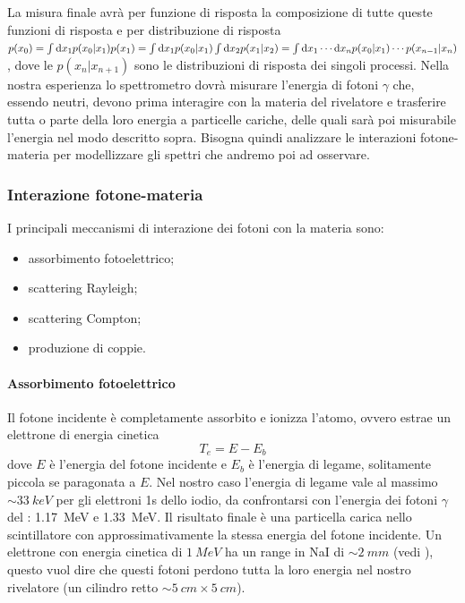 La misura finale avrà per funzione di risposta la composizione di tutte queste funzioni di risposta e per distribuzione di risposta  $p(x_0)=\int\mathrm{d} x_1 p(x_0|x_1) p(x_1)
=\int \mathrm{d} x_1 p(x_0|x_1) \int \mathrm{d} x_2 p(x_1|x_2)
=\int \mathrm{d} x_1 \dotsm \mathrm{d} x_n p(x_0|x_1)\dotsm p(x_{n-1}|x_n)$, dove le $p(x_n|x_{n+1})$ sono le distribuzioni di risposta dei singoli processi.
Nella nostra esperienza lo spettrometro dovrà misurare l'energia di fotoni $\gamma$ che, essendo neutri, devono prima interagire con la materia del rivelatore e trasferire tutta o parte della loro energia a particelle cariche, delle quali sarà poi misurabile l'energia nel modo descritto sopra. Bisogna quindi analizzare le interazioni fotone-materia per modellizzare gli spettri che andremo poi ad osservare.


\subsubsection{Interazione fotone-materia}
I principali meccanismi di interazione dei fotoni con la materia sono:
\begin{itemize}
	\item assorbimento fotoelettrico;
	\item scattering Rayleigh;
	\item scattering Compton;
	\item produzione di coppie.
\end{itemize}
  
 \paragraph{Assorbimento fotoelettrico}
 Il fotone incidente è completamente assorbito e ionizza l'atomo, ovvero estrae un elettrone di energia cinetica 
 \begin{equation} \label{eq:fotoelettrico}
 T_e = E - E_b
 \end{equation} 
 dove $E$ è l'energia del fotone incidente e $E_b$ è l'energia di legame, solitamente piccola se paragonata a $E$. Nel nostro caso l'energia di legame vale al massimo $\sim \SI{33}{keV}$ per gli elettroni 1s dello iodio, da confrontarsi con l'energia dei fotoni $\gamma$ del \co{}: \SI{1.17}{MeV} e \SI{1.33}{MeV}. Il risultato finale è una particella carica nello scintillatore con approssimativamente la stessa energia del fotone incidente.
 Un elettrone con energia cinetica di $\SI{1}{MeV}$ ha un range in NaI di $\sim \SI{2}{mm}$ (vedi \cite{3}), questo vuol dire che questi fotoni perdono tutta la loro energia nel nostro rivelatore (un cilindro retto $\sim \SI{5}{cm} \times \SI{5}{cm}$). 

